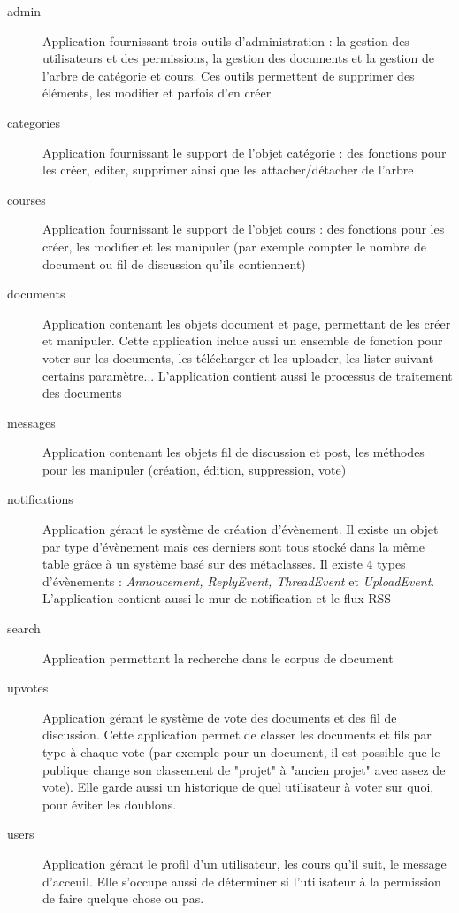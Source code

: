 \documentclass[a4paper,12pt]{article}
\begin{document}
\begin{description}
\item[admin] Application fournissant trois outils d'administration : la gestion
   des utilisateurs et des permissions, la gestion des documents et la gestion
   de l'arbre de catégorie et cours. Ces outils permettent de supprimer des éléments,
   les modifier et parfois d'en créer
\item[categories] Application fournissant le support de l'objet catégorie :
   des fonctions pour les créer, editer, supprimer ainsi que les attacher/détacher de l'arbre
\item[courses] Application fournissant le support de l'objet cours :
   des fonctions pour les créer, les modifier et les manipuler (par exemple compter le nombre
   de document ou fil de discussion qu'ils contiennent)
\item[documents] Application contenant les objets document et page, permettant de les
   créer et manipuler. Cette application inclue aussi un ensemble de fonction pour
   voter sur les documents, les télécharger et les uploader, les lister suivant certains
   paramètre... L'application contient aussi le processus de traitement des documents
\item[messages] Application contenant les objets fil de discussion et post, les méthodes
   pour les manipuler (création, édition, suppression, vote)
\item[notifications] Application gérant le système de création d'évènement. Il existe
   un objet par type d'évènement mais ces derniers sont tous stocké dans la même
   table grâce à un système basé sur des métaclasses. Il existe 4 types d'évènements :
   \textit{Annoucement, ReplyEvent, ThreadEvent} et \textit{UploadEvent}. L'application
   contient aussi le mur de notification et le flux RSS
\item[search] Application permettant la recherche dans le corpus de document
\item[upvotes] Application gérant le système de vote des documents et des fil de discussion.
   Cette application permet de classer les documents et fils par type à chaque vote
   (par exemple pour un document, il est possible que le publique change son classement
   de "projet" à "ancien projet" avec assez de vote). Elle garde aussi un historique
   de quel utilisateur à voter sur quoi, pour éviter les doublons.
\item[users] Application gérant le profil d'un utilisateur, les cours qu'il suit, le
   message d'acceuil. Elle s'occupe aussi de déterminer si l'utilisateur à la permission
   de faire quelque chose ou pas.
\end{description}
\end{document}
